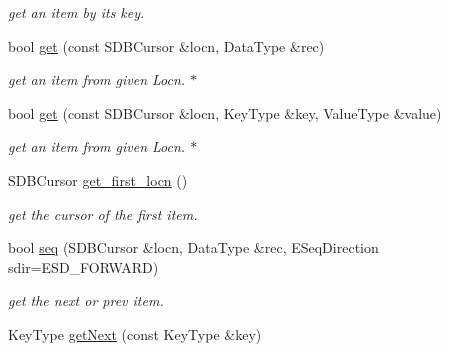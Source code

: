 \begin{CompactItemize}
\begin{CompactList}\small\item\em get an item by its key. \item\end{CompactList}\item 
\hypertarget{classBTreeFile_45d39b668e269770ff9402628067a973}{
bool \hyperlink{classBTreeFile_45d39b668e269770ff9402628067a973}{get} (const SDBCursor \&locn, DataType \&rec)}
\label{classBTreeFile_45d39b668e269770ff9402628067a973}

\begin{CompactList}\small\item\em get an item from given Locn. $\ast$ \item\end{CompactList}\item 
\hypertarget{classBTreeFile_1771c662eafbb8d90d945659dcdc9ffd}{
bool \hyperlink{classBTreeFile_1771c662eafbb8d90d945659dcdc9ffd}{get} (const SDBCursor \&locn, KeyType \&key, ValueType \&value)}
\label{classBTreeFile_1771c662eafbb8d90d945659dcdc9ffd}

\begin{CompactList}\small\item\em get an item from given Locn. $\ast$ \item\end{CompactList}\item 
\hypertarget{classBTreeFile_b375e1166dd179b0e6f54c2daff7ae91}{
SDBCursor \hyperlink{classBTreeFile_b375e1166dd179b0e6f54c2daff7ae91}{get\_\-first\_\-locn} ()}
\label{classBTreeFile_b375e1166dd179b0e6f54c2daff7ae91}

\begin{CompactList}\small\item\em get the cursor of the first item. \item\end{CompactList}\item 
\hypertarget{classBTreeFile_dbd89f1e470008e7a008b22a99c9e0b5}{
bool \hyperlink{classBTreeFile_dbd89f1e470008e7a008b22a99c9e0b5}{seq} (SDBCursor \&locn, DataType \&rec, ESeqDirection sdir=ESD\_\-FORWARD)}
\label{classBTreeFile_dbd89f1e470008e7a008b22a99c9e0b5}

\begin{CompactList}\small\item\em get the next or prev item. \item\end{CompactList}\item 
\hypertarget{classBTreeFile_0fb8cd6989e717ddefcd9514657c708b}{
KeyType \hyperlink{classBTreeFile_0fb8cd6989e717ddefcd9514657c708b}{getNext} (const KeyType \&key)}
\label{classBTreeFile_0fb8cd6989e717ddefcd9514657c708b}


\end{CompactItemize}
